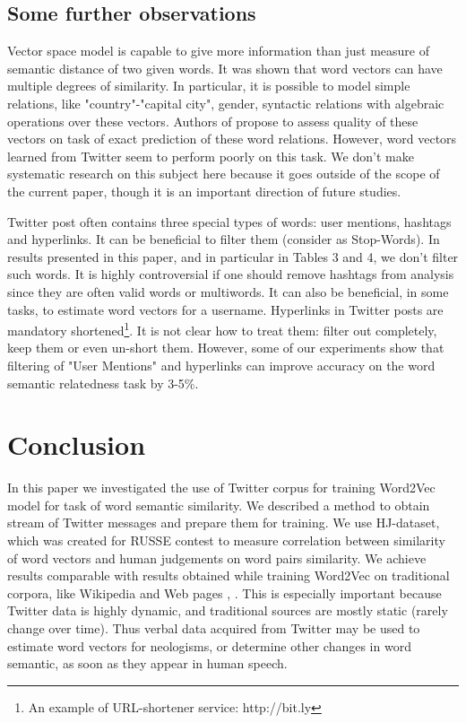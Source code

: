 \documentclass{llncs}
\begin{document}
\subsection{Some further observations}
Vector space model is capable to give more information than just measure of semantic distance of two given words. It was shown that word vectors can have multiple degrees of similarity. In particular, it is possible to model simple relations, like "country"-"capital city", gender, syntactic relations with algebraic operations over these vectors. Authors of \cite{Word2Vec} propose to assess quality of these vectors on task of exact prediction of these word relations. However, word vectors learned from Twitter seem to perform poorly on this task. We don’t make systematic research on this subject here because it goes outside of the scope of the current paper, though it is an important direction of future studies.

Twitter post often contains three special types of words: user mentions, hashtags and hyperlinks. It can be beneficial to filter them (consider as Stop-Words). In results presented in this paper, and in particular in Tables 3 and 4, we don’t filter such words. It is highly controversial if one should remove hashtags from analysis since they are often valid words or multiwords. It can also be beneficial, in some tasks, to estimate word vectors for a username. Hyperlinks in Twitter posts are mandatory shortened\footnote{An example of URL-shortener service: http://bit.ly}. It is not clear how to treat them: filter out completely, keep them or even un-short them. However, some of our experiments show that filtering of "User Mentions" and hyperlinks can improve accuracy on the word semantic relatedness task by 3-5\%. 
\section{Conclusion}
In this paper we investigated the use of Twitter corpus for training Word2Vec model for task of word semantic similarity. We described a method to obtain stream of Twitter messages and prepare them for training. We use HJ-dataset, which was created for RUSSE contest \cite{Panchenko2015} to measure correlation between similarity of word vectors and human judgements on word pairs similarity. We achieve results comparable with results obtained while training Word2Vec on traditional corpora, like Wikipedia and Web pages \cite{Arefyev}, \cite{Kutuzov}. This is especially important because Twitter data is highly dynamic, and traditional sources are mostly static (rarely change over time). Thus verbal data acquired from Twitter may be used to estimate word vectors for neologisms, or determine other changes in word semantic, as soon as they appear in human speech. 
%
%


\end{document}
